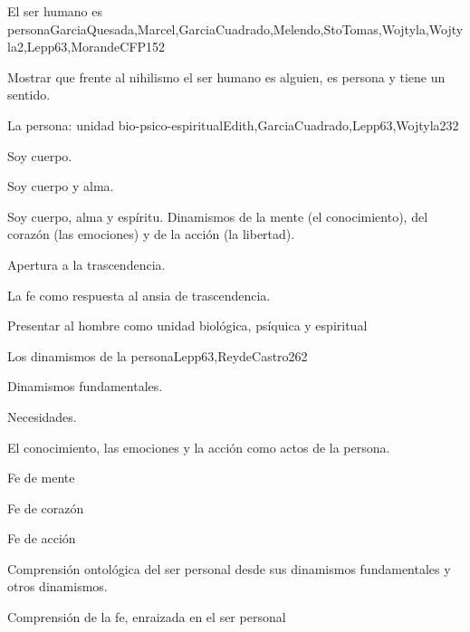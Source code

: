 \begin{syllabus}
\begin{unit}{El ser humano es persona}{GarciaQuesada,Marcel,GarciaCuadrado,Melendo,StoTomas,Wojtyla,Wojtyla2,Lepp63,MorandeCFP}{15}{2}
\begin{unitgoals}
	\item Mostrar que frente al nihilismo el ser humano es alguien, es persona y tiene un sentido.
\end{unitgoals}
\end{unit}

\begin{unit}{La persona: unidad bio-psico-espiritual}{Edith,GarciaCuadrado,Lepp63,Wojtyla2}{3}{2}
\begin{topics}
 		\item Soy cuerpo.
 		\item Soy cuerpo y alma.
 		\item Soy cuerpo, alma y espíritu.  Dinamismos de la mente (el conocimiento), del corazón (las emociones) y de la acción (la libertad).
 		\item Apertura a la trascendencia.
 		\item La fe como respuesta al ansia de trascendencia.
\end{topics}

\begin{unitgoals}
	\item Presentar al hombre como unidad biológica, psíquica y espiritual
\end{unitgoals}
\end{unit}

\begin{unit}{Los dinamismos de la persona}{Lepp63,ReydeCastro2}{6}{2}
\begin{topics}
 	 		\item Dinamismos fundamentales.
 	 		\item Necesidades.
 	 		\item El conocimiento, las emociones y la acción como actos de la persona.
 	 		\item Fe de mente
 	 		\item Fe de corazón
 	 		\item Fe de acción
\end{topics}

\begin{unitgoals}
	\item Comprensión ontológica del ser personal desde sus dinamismos fundamentales y otros dinamismos.
	\item Comprensión de la fe, enraizada en el ser personal

\end{unitgoals}
\end{unit}


\end{syllabus}
